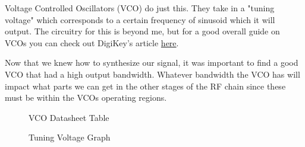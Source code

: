 Voltage Controlled Oscillators (VCO) do just this. They take in a "tuning voltage" which corresponds to a certain frequency
of sinusoid which it will output. The circuitry for this is beyond me, but for a good overall guide on VCOs you can check out
DigiKey's article \href{https://www.digikey.com/en/articles/the-basics-of-voltage-controlled-oscillators-vcos}{here}.

Now that we knew how to synthesize our signal, it was important to find a good VCO that had a high output bandwidth. Whatever
bandwidth the VCO has will impact what parts we can get in the other stages of the RF chain since these must be within the VCOs
operating regions. 

\begin{figure}[H]
    \centering
    \caption{VCO Datasheet Table}
    \label{img:vcotable}
\end{figure}
\begin{figure}[H]
    \centering
    \caption{Tuning Voltage Graph}
    \label{img:tuninggraph}
\end{figure}

